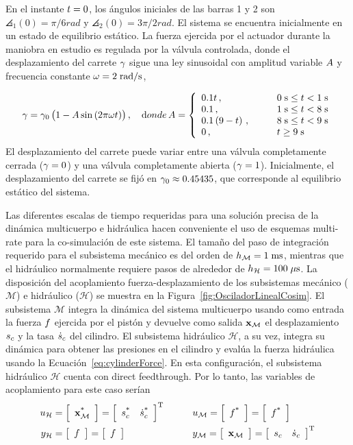 En el instante $\ctime = 0$, los ángulos iniciales de las barras 1 y 2 son $\angles_1(0) = {\pi}/{6}\unit{rad}$ y $\angles_2(0) = {3\pi}/{2}\unit{rad}$.
El sistema se encuentra inicialmente en un estado de equilibrio estático.
La fuerza ejercida por el actuador durante la maniobra en estudio es regulada por la válvula controlada, donde el desplazamiento del carrete $\spool$ sigue una ley sinusoidal con amplitud variable $\amplitude$ y frecuencia constante $\angular = 2\unit{rad/s}$,

%
\begin{equation}
	\spool = \spool_0 \plbr{1 - \amplitude \sin\plbr{2\pi\angular \ctime}} , \quad
	{\textrm donde}\,
	\amplitude = \lcubr{\matr{lcl}{
			0.1\ctime \,, &\quad & 0\unit{s} \leq \ctime < 1\unit{s}	
			\\	
			0.1 \,, &\quad & 1\unit{s} \leq \ctime < 8\unit{s}	
			\\
			0.1 \plbr{9-\ctime} \,, &\quad & 8\unit{s} \leq \ctime < 9\unit{s}	
			\\
			0 \,, &\quad & \ctime \geq 9\unit{s}	
	}}
	\label{eq:timeHistoryValveSinusoidal}
\end{equation}
%
El desplazamiento del carrete puede variar entre una válvula completamente cerrada ($\spool = 0$) y una válvula completamente abierta ($\spool = 1$).
Inicialmente, el desplazamiento del carrete se fijó en $\spool_0 \approx 0.45435$, que corresponde al equilibrio estático del sistema.


Las diferentes escalas de tiempo requeridas para una solución precisa de la dinámica multicuerpo e hidráulica hacen conveniente el uso de esquemas multi-rate para la co-simulación de este sistema.
El tamaño del paso de integración requerido para el subsistema mecánico es del orden de $\microstep_{\mathcal{M}} = 1\unit{ms}$, mientras que el hidráulico normalmente requiere pasos de alrededor de $\microstep_{\mathcal{H} } = 100\unit{\mu s}$.
La disposición del acoplamiento fuerza-desplazamiento de los subsistemas mecánico ($\mathcal{M}$) e hidráulico ($\mathcal{H}$) se muestra en la Figura~\ref{fig:OsciladorLinealCosim}.
El subsistema $\mathcal{M}$ integra la dinámica del sistema multicuerpo usando como entrada la fuerza $\force$ ejercida por el pistón y devuelve como salida $\state_\mathcal{M}$ el desplazamiento $\cyldisplacement$ y la tasa $\cylvelocity $ del cilindro.
El subsistema hidráulico $\mathcal{H}$, a su vez, integra su dinámica para obtener las presiones en el cilindro y evalúa la fuerza hidráulica usando la Ecuación~\eqref{eq:cylinderForce}.
En esta configuración, el subsistema hidráulico $\mathcal{H}$ cuenta con direct feedthrough.
Por lo tanto, las variables de acoplamiento para este caso serían
%
\begin{align}
	\inputs_\mathcal{H} &= \sqbr{\matr{c}{\state_\mathcal{M}\extr}} = \sqbr{\matr{cc}{ \cyldisplacement\extr & \cylvelocity\extr}}\trans &\quad\quad &\inputs_\mathcal{M} = \sqbr{\matr{c}{ \force\extr }} = \sqbr{\matr{c}{ \forceMod\extr }}\notag\\
	\outputs_\mathcal{H} &= \sqbr{\matr{c}{ \force }} = \sqbr{\matr{c}{ \forceMod }}&\quad\quad &\outputs_\mathcal{M} = \sqbr{\matr{c}{\state_\mathcal{M}}} = \sqbr{\matr{cc}{ \cyldisplacement & \cylvelocity }}\trans
\end{align}
